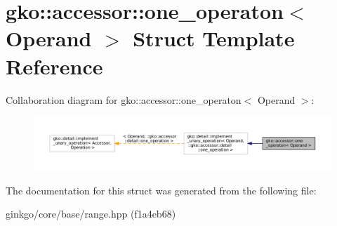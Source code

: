 \hypertarget{structgko_1_1accessor_1_1one__operaton}{}\section{gko\+:\+:accessor\+:\+:one\+\_\+operaton$<$ Operand $>$ Struct Template Reference}
\label{structgko_1_1accessor_1_1one__operaton}


Collaboration diagram for gko\+:\+:accessor\+:\+:one\+\_\+operaton$<$ Operand $>$\+:
\nopagebreak
\begin{figure}[H]
\begin{center}
\leavevmode
\includegraphics[width=350pt]{structgko_1_1accessor_1_1one__operaton__coll__graph}
\end{center}
\end{figure}


The documentation for this struct was generated from the following file\+:\begin{DoxyCompactItemize}
\item 
ginkgo/core/base/range.\+hpp (f1a4eb68)\end{DoxyCompactItemize}
